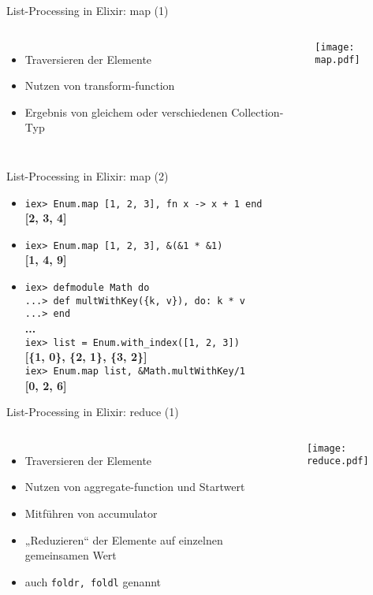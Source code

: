 \documentclass[compress]{beamer}
\begin{document}
  \begin{frame}{List-Processing in Elixir: map (1)}
    \begin{columns}[c]
      \begin{itemize}
        \item Traversieren der Elemente
        \item Nutzen von transform-function
        \item Ergebnis von gleichem oder verschiedenen Collection-Typ
      \end{itemize}
    \texttt{[image: map.pdf]}
    \end{columns}
  \end{frame}

  \begin{frame}{List-Processing in Elixir: map (2)}
    \begin{itemize}[<+->]
    \item
      \texttt{iex> Enum.map [1, 2, 3], fn x -> x + 1 end} \\
      \textbf{[2, 3, 4]} \\
    \item
      \texttt{iex> Enum.map [1, 2, 3], \&(\&1 * \&1)} \\
      \textbf{[1, 4, 9]} \\
    \item
      \texttt{iex> defmodule Math do \\
            ...> def multWithKey(\{k, v\}), do: k * v \\
            ...> end\\
      }
      \textbf{...} \\
      \texttt{iex> list = Enum.with\_index([1, 2, 3])} \\
      \textbf{[\{1, 0\}, \{2, 1\}, \{3, 2\}]} \\
      \texttt{iex> Enum.map list, \&Math.multWithKey/1} \\
      \textbf{[0, 2, 6]} \\
    \end{itemize}
  \end{frame}

  \begin{frame}{List-Processing in Elixir: reduce (1)}
    \begin{columns}[c]
      \begin{itemize}
        \item Traversieren der Elemente
        \item Nutzen von aggregate-function und Startwert
        \item Mitführen von accumulator
        \item „Reduzieren“ der Elemente auf einzelnen gemeinsamen Wert
        \item auch \texttt{foldr, foldl} genannt
      \end{itemize}
    \texttt{[image: reduce.pdf]}
    \end{columns}
  \end{frame}
\end{document}
